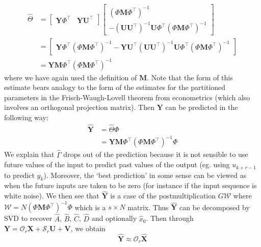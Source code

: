 \documentclass[11pt]{report} %
\begin{document}
\begin{align}
\widehat{\Theta} &= \begin{bmatrix}\mathbf{Y}\Phi^{\top} & \mathbf{Y}\mathbf{U}^{\top}\end{bmatrix}\begin{bmatrix}\left(\Phi\mathbf{M}\Phi^{\top}\right)^{-1}\\
-\left(\mathbf{U}\mathbf{U}^{\top}\right)^{-1}\mathbf{U}\Phi^{\top}\left(\Phi\mathbf{M}\Phi^{\top}\right)^{-1}
\end{bmatrix} \\
&= \begin{bmatrix}\mathbf{Y}\Phi^{\top}\left(\Phi\mathbf{M}\Phi^{\top}\right)^{-1}-\mathbf{Y}\mathbf{U}^{\top}\left(\mathbf{U}\mathbf{U}^{\top}\right)^{-1}\mathbf{U}\Phi^{\top}\left(\Phi\mathbf{M}\Phi^{\top}\right)^{-1}\end{bmatrix} \\
&= \mathbf{Y}\mathbf{M}\Phi^{\top}\left(\Phi\mathbf{M}\Phi^{\top}\right)^{-1}
\end{align}
where we have again used the definition of $\mathbf{M}$. Note that the form of this estimate bears analogy to the form of the estimates for the partitioned parameters in the Frisch-Waugh-Lovell theorem from econometrics (which also involves an orthogonal projection matrix). Then $\mathbf{Y}$ can be predicted in the following way:
\begin{align}
\widehat{\mathbf{Y}} &= \widehat{\Theta}\Phi \\
&= \mathbf{Y}\mathbf{M}\Phi^{\top}\left(\Phi\mathbf{M}\Phi^{\top}\right)^{-1}\Phi
\end{align}
We explain that $\widehat{\Gamma}$ drops out of the prediction because it is not sensible to use future values of the input to predict past values of the output (eg. using $u_{k + r - 1}$ to predict $y_{k}$). Moreover, the `best prediction' in some sense can be viewed as when the future inputs are taken to be zero (for instance if the input sequence is white noise). We then see that $\widehat{\mathbf{Y}}$ is a case of the postmultiplication $G\mathcal{W}$ where $\mathcal{W} = N\left(\Phi\mathbf{M}\Phi^{\top}\right)^{-1}\Phi$ which is a $s \times N$ matrix. Thus $\widehat{\mathbf{Y}}$ can be decomposed by SVD to recover $\widehat{A}$, $\widehat{B}$, $\widehat{C}$, $\widehat{D}$ and optionally $\widehat{x}_{0}$.  Then through $\mathbf{Y} = \mathcal{O}_{r}\mathbf{X} + \mathcal{S}_{r}\mathbf{U} + \mathbf{V}$, we obtain
\begin{equation}
\widehat{\mathbf{Y}} \approx \mathcal{O}_{r}\widehat{\mathbf{X}}
\end{equation}
\end{document}

